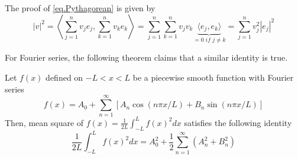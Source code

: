 The proof of \eqref{eq.Pythagorean} is given by 
\begin{equation*}
    |v|^2 = \left\langle\sum_{j = 1}^{n}v_j e_j, \sum_{k = 1}^{n}v_k e_k\right\rangle = \sum_{j = 1}^{n}\sum_{k = 1}^{n}v_jv_k\underbrace{\langle e_j, e_k\rangle}_{= 0\textit{ if }j\neq k} = \sum_{j = 1}^{n}v_j^2 |e_j|^2
\end{equation*}

For Fourier series, the following theorem claims that a similar identity is true.

\begin{theorem}
    Let $f(x)$ defined on $-L<x<L$ be a piecewise smooth function with Fourier series 
    \begin{equation}\label{eq.Parseval_assumption}
        f(x) = A_0+\sum_{n=1}^{\infty}[A_n \cos (n \pi x / L)+B_n \sin (n \pi x / L)]
    \end{equation}
    Then, mean square of $f(x)=\frac{1}{2 L} \int_{-L}^L f(x)^2 d x$ satisfies the following identity
    \begin{equation}\label{eq.Parseval_fourier}
        \frac{1}{2 L} \int_{-L}^L f(x)^2 d x=A_0^2+\frac{1}{2} \sum_{n=1}^{\infty}\left(A_n^2+B_n^2\right)
    \end{equation}
\end{theorem}
